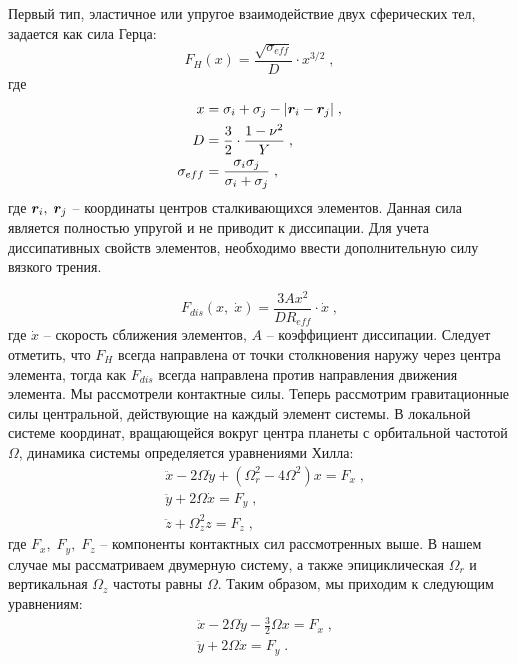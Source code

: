Первый тип,
эластичное или упругое взаимодействие двух сферических тел, задается как сила Герца:
\begin{equation}
  F_H(x) = \frac{\sqrt{\sigma_{eff}}}{D}\cdot x^{3/2}\;,
\end{equation}
где
\begin{equation}
  \begin{split}
    x &= \sigma_i + \sigma_j - \vert \bm{r}_i-\bm{r}_j\vert\;,\\
    D &= \frac{3}{2}\cdot\frac{1-\nu^2}{Y}\;,\\
    \sigma_{eff} &= \frac{\sigma_i\sigma_j}{\sigma_i+\sigma_j}\;,
  \end{split}
\end{equation}
где $\bm{r}_i,\;\bm{r}_j$ -- координаты центров сталкивающихся элементов. Данная сила является полностью упругой и не приводит к диссипации.
Для учета диссипативных свойств элементов, необходимо ввести дополнительную силу вязкого трения. 

\begin{equation}
  F_{dis}(x,\;\dot{x}) = \frac{3Ax^2}{DR_{eff}}\cdot\dot{x}\;,
\end{equation}
где $\dot{x}$ -- скорость сближения элементов, $A$ -- коэффициент диссипации. Следует отметить, что $F_H$ всегда направлена
от точки столкновения наружу через центра элемента, тогда как $F_{dis}$ всегда направлена против направления движения элемента.
Мы рассмотрели контактные силы. Теперь рассмотрим гравитационные силы центральной, действующие на каждый элемент системы. 
В локальной системе координат, вращающейся вокруг центра планеты с орбитальной частотой $\Omega$, динамика системы 
определяется уравнениями Хилла:
\begin{equation}
  \begin{split}
    &\ddot{x} - 2\Omega\dot{y}+\left(\Omega_r^2-4\Omega^2\right)x = F_x\;,\\
    &\ddot{y} + 2\Omega\dot{x} = F_y\;,\\
    &\ddot{z} + \Omega_z^2z = F_z\;,
  \end{split}
\end{equation}
где $F_x,\;F_y,\;F_z$ -- компоненты контактных сил рассмотренных выше. В нашем случае мы рассматриваем двумерную систему, а также 
эпициклическая $\Omega_r$ и вертикальная $\Omega_z$ частоты равны $\Omega$. Таким образом, мы приходим к следующим уравнениям:
\begin{equation}
  \begin{split}
    &\ddot{x}-2\Omega\dot{y}-\frac{3}{2}\Omega x = F_x\;,\\
    &\ddot{y}+2\Omega\dot{x} = F_y\;. 
  \end{split}
\end{equation}

